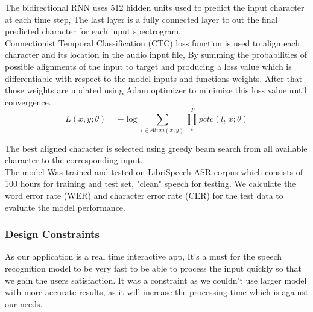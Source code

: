 The bidirectional RNN uses 512 hidden units used to predict the input character at each time step, The last layer is a fully connected layer to out the final predicted character for each input spectrogram. \\

Connectionist Temporal Classification (CTC) loss function is used to align each character and its location in the audio input file, By summing the probabilities of possible alignments of the input to target and producing a loss value which is differentiable with respect to the model inputs and functions weights. After that those weights are updated using Adam optimizer to minimize this loss value until convergence. \\
\begin{equation}
    L(x,y;\theta) = - \log \sum_{l 	\in Align(x,y)}^{} \prod_{t}^{T} pctc (l_{t} |x;\theta )
\end{equation}

The best aligned character is selected using greedy beam search from all available character to the corresponding input. \\ 
The model Was trained and tested on LibriSpeech ASR corpus which consists of 100 hours for training and test set, "clean" speech for testing. We calculate the word error rate (WER) and character error rate (CER) for the test data to evaluate the model performance.


\subsubsection{Design Constraints}

As our application is a real time interactive app, It’s a must for the speech recognition model to be very fast to be able to process the input quickly so that we gain the users satisfaction. It was a constraint as we couldn't  use larger model with more accurate results, as it will increase the processing time which is against our needs.

